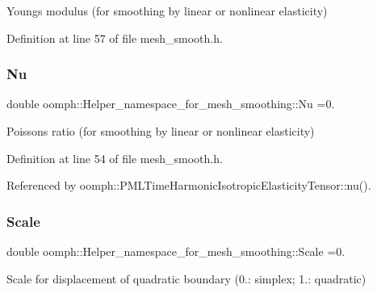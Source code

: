 Young\textquotesingle{}s modulus (for smoothing by linear or nonlinear elasticity) 



Definition at line 57 of file mesh\+\_\+smooth.\+h.

\mbox{\label{namespaceoomph_1_1Helper__namespace__for__mesh__smoothing_a27eabf4a5c7ca88b62dcb3e87462587e}} 
\subsubsection{\texorpdfstring{Nu}{Nu}}
{\footnotesize\ttfamily double oomph\+::\+Helper\+\_\+namespace\+\_\+for\+\_\+mesh\+\_\+smoothing\+::\+Nu =0.}



Poisson\textquotesingle{}s ratio (for smoothing by linear or nonlinear elasticity) 



Definition at line 54 of file mesh\+\_\+smooth.\+h.



Referenced by oomph\+::\+P\+M\+L\+Time\+Harmonic\+Isotropic\+Elasticity\+Tensor\+::nu().

\mbox{\label{namespaceoomph_1_1Helper__namespace__for__mesh__smoothing_a1becf6969521c3750d1267dd619a2d41}} 
\subsubsection{\texorpdfstring{Scale}{Scale}}
{\footnotesize\ttfamily double oomph\+::\+Helper\+\_\+namespace\+\_\+for\+\_\+mesh\+\_\+smoothing\+::\+Scale =0.}



Scale for displacement of quadratic boundary (0.\+: simplex; 1.\+: quadratic) 



